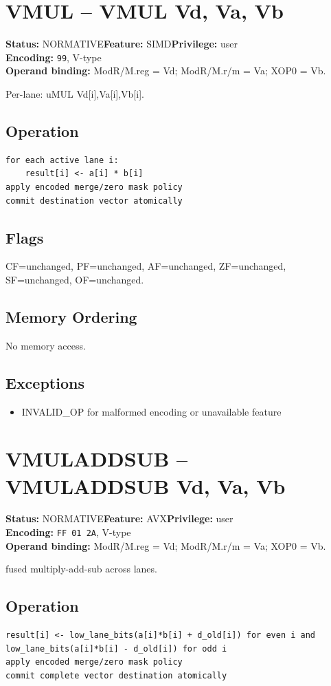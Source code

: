 \documentclass[10pt]{article}
\begin{document}
\section{VMUL -- VMUL Vd, Va, Vb}
\textbf{Status:} NORMATIVE\quad \textbf{Feature:} SIMD\quad \textbf{Privilege:} user\\
\textbf{Encoding:} \texttt{99}, V-type\\
\textbf{Operand binding:} ModR/M.reg = Vd; ModR/M.r/m = Va; XOP0 = Vb.

Per-lane: uMUL Vd[i],Va[i],Vb[i].

\subsection*{Operation}
\begin{lstlisting}
for each active lane i:
    result[i] <- a[i] * b[i]
apply encoded merge/zero mask policy
commit destination vector atomically
\end{lstlisting}
\subsection*{Flags}
CF=unchanged, PF=unchanged, AF=unchanged, ZF=unchanged, SF=unchanged, OF=unchanged.
\subsection*{Memory Ordering}
No memory access.
\subsection*{Exceptions}
\begin{itemize}
\item INVALID\_OP for malformed encoding or unavailable feature
\end{itemize}
\clearpage

\section{VMULADDSUB -- VMULADDSUB Vd, Va, Vb}
\textbf{Status:} NORMATIVE\quad \textbf{Feature:} AVX\quad \textbf{Privilege:} user\\
\textbf{Encoding:} \texttt{FF 01 2A}, V-type\\
\textbf{Operand binding:} ModR/M.reg = Vd; ModR/M.r/m = Va; XOP0 = Vb.

fused multiply-add-sub across lanes.

\subsection*{Operation}
\begin{lstlisting}
result[i] <- low_lane_bits(a[i]*b[i] + d_old[i]) for even i and low_lane_bits(a[i]*b[i] - d_old[i]) for odd i
apply encoded merge/zero mask policy
commit complete vector destination atomically
\end{lstlisting}
\end{document}
